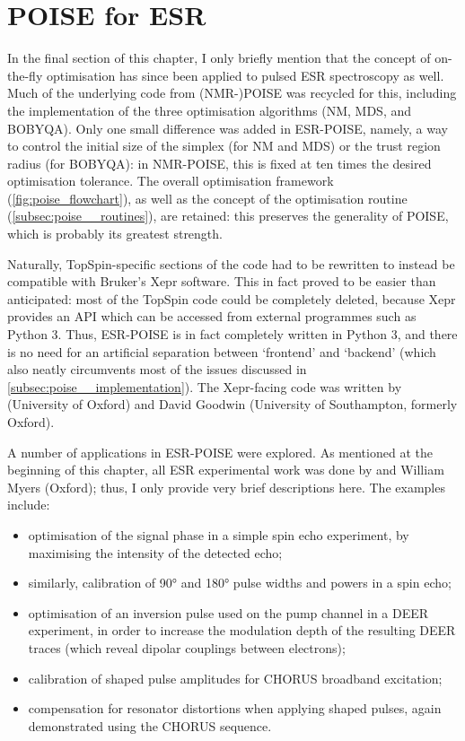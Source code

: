 \section{POISE for ESR}
\label{sec:poise__esrpoise}

In the final section of this chapter, I only briefly mention that the concept of on-the-fly optimisation has since been applied to pulsed ESR spectroscopy as well.
Much of the underlying code from (NMR-)POISE was recycled for this, including the implementation of the three optimisation algorithms (NM, MDS, and BOBYQA).
Only one small difference was added in ESR-POISE, namely, a way to control the initial size of the simplex (for NM and MDS) or the trust region radius (for BOBYQA): in NMR-POISE, this is fixed at ten times the desired optimisation tolerance.
The overall optimisation framework (\cref{fig:poise_flowchart}), as well as the concept of the optimisation routine (\cref{subsec:poise__routines}), are retained: this preserves the generality of POISE, which is probably its greatest strength.

Naturally, TopSpin-specific sections of the code had to be rewritten to instead be compatible with Bruker's Xepr software.
This in fact proved to be easier than anticipated: most of the TopSpin code could be completely deleted, because Xepr provides an API which can be accessed from external programmes such as Python 3.
Thus, ESR-POISE is in fact completely written in Python 3, and there is no need for an artificial separation between `frontend' and `backend' (which also neatly circumvents most of the issues discussed in \cref{subsec:poise__implementation}).
The Xepr-facing code was written by \JBV{} (University of Oxford) and David Goodwin (University of Southampton, formerly Oxford).

A number of applications in ESR-POISE were explored.
As mentioned at the beginning of this chapter, all ESR experimental work was done by \JBV{} and William Myers (Oxford); thus, I only provide very brief descriptions here.
The examples include:

\begin{itemize}
    \item optimisation of the signal phase in a simple spin echo experiment, by maximising the intensity of the detected echo;
    \item similarly, calibration of \ang{90} and \ang{180} pulse widths and powers in a spin echo;
    \item optimisation of an inversion pulse used on the pump channel in a DEER experiment\autocite{Pannier2000JMR}, in order to increase the modulation depth of the resulting DEER traces (which reveal dipolar couplings between electrons);
    \item calibration of shaped pulse amplitudes for CHORUS broadband excitation\autocite{Foroozandeh2019JMR,Verstraete2021JCP};
    \item compensation for resonator distortions when applying shaped pulses, again demonstrated using the CHORUS sequence.
\end{itemize}


